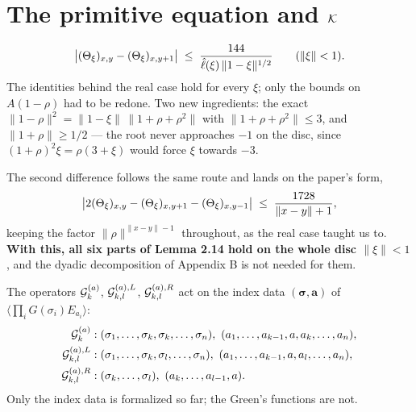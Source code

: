 \chapter{The primitive equation and $\mathcal{K}$}

\begin{lemma}\label{lem:Theta-diff-complex}
  \leanok{}
  \[ \bigl|(\Theta_\xi)_{x,y}-(\Theta_\xi)_{x,y+1}\bigr| \;\le\;
     \frac{144}{\hat\ell(\xi)\,\|1-\xi\|^{1/2}} \qquad (\|\xi\| < 1). \]
  The identities behind the real case hold for every $\xi$; only the bounds on $A(1-\rho)$
  had to be redone.  Two new ingredients: the exact
  $\|1-\rho\|^2 = \|1-\xi\|\,\|1+\rho+\rho^2\|$ with $\|1+\rho+\rho^2\|\le 3$, and
  $\|1+\rho\| \ge 1/2$ --- the root never approaches $-1$ on the disc, since
  $(1+\rho)^2\xi = \rho(3+\xi)$ would force $\xi$ towards $-3$.

  The second difference follows the same route and lands on the paper's form,
  \[ \bigl|2(\Theta_\xi)_{x,y}-(\Theta_\xi)_{x,y+1}-(\Theta_\xi)_{x,y-1}\bigr|
     \;\le\; \frac{1728}{\|x-y\|+1} , \]
  keeping the factor $\|\rho\|^{\|x-y\|-1}$ throughout, as the real case taught us to.
  \textbf{With this, all six parts of Lemma 2.14 hold on the whole disc $\|\xi\|<1$},
  and the dyadic decomposition of Appendix B is not needed for them.
\end{lemma}

\begin{definition}\label{def:loops}
  \leanok
  The operators $\mathcal{G}^{(a)}_k$, $\mathcal{G}^{(a),L}_{k,l}$, $\mathcal{G}^{(a),R}_{k,l}$ act on the
  index data $(\boldsymbol\sigma,\mathbf a)$ of $\langle\prod_i G(\sigma_i)E_{a_i}\rangle$:
  \begin{align*}
    \Gcal^{(a)}_k &: (\sigma_1,\dots,\sigma_k,\sigma_k,\dots,\sigma_n),\
      (a_1,\dots,a_{k-1},a,a_k,\dots,a_n),\\
    \Gcal^{(a),L}_{k,l} &: (\sigma_1,\dots,\sigma_k,\sigma_l,\dots,\sigma_n),\
      (a_1,\dots,a_{k-1},a,a_l,\dots,a_n),\\
    \Gcal^{(a),R}_{k,l} &: (\sigma_k,\dots,\sigma_l),\ (a_k,\dots,a_{l-1},a).
  \end{align*}
  Only the index data is formalized so far; the Green's functions are not.
\end{definition}

